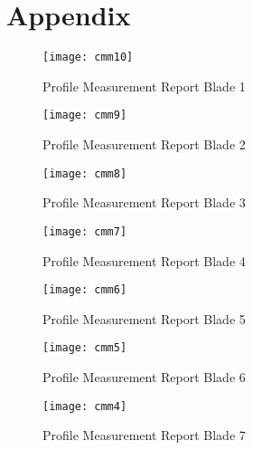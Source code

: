 
%

\chapter{Appendix}
\label{app:appendix}


\begin{figure}[H]
    \centering
    \texttt{[image: cmm10]}
    \caption{Profile Measurement Report Blade 1}
    \label{fig:cmm10}
\end{figure}

\begin{figure}[H]
    \centering
    \texttt{[image: cmm9]}
    \caption{Profile Measurement Report Blade 2}
    \label{fig:cmm9}
\end{figure}

\begin{figure}[H]
    \centering
    \texttt{[image: cmm8]}
    \caption{Profile Measurement Report Blade 3}
    \label{fig:cmm8}
\end{figure}

\begin{figure}[H]
    \centering
    \texttt{[image: cmm7]}
    \caption{Profile Measurement Report Blade 4}
    \label{fig:cmm7}
\end{figure}

\begin{figure}[H]
    \centering
    \texttt{[image: cmm6]}
    \caption{Profile Measurement Report Blade 5}
    \label{fig:cmm6}
\end{figure}

\begin{figure}[H]
    \centering
    \texttt{[image: cmm5]}
    \caption{Profile Measurement Report Blade 6}
    \label{fig:cmm5}
\end{figure}

\begin{figure}[H]
    \centering
    \texttt{[image: cmm4]}
    \caption{Profile Measurement Report Blade 7}
    \label{fig:cmm4}
\end{figure}

